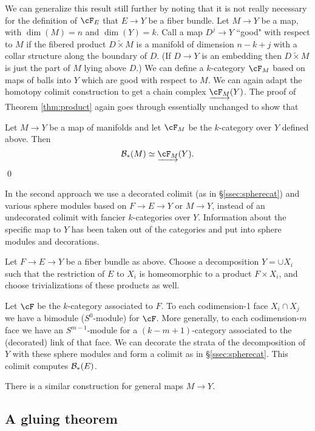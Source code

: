 We can generalize this result still further by noting that it is not really necessary
for the definition of $\cF_E$ that $E\to Y$ be a fiber bundle.
Let $M\to Y$ be a map, with $\dim(M) = n$ and $\dim(Y) = k$.
Call a map $D^j\to Y$ ``good" with respect to $M$ if the fibered product
$D\widetilde{\times} M$ is a manifold of dimension $n-k+j$ with a collar structure along the boundary of $D$.
(If $D\to Y$ is an embedding then $D\widetilde{\times} M$ is just the part of $M$
lying above $D$.)
We can define a $k$-category $\cF_M$ based on maps of balls into $Y$ which are good with respect to $M$.
We can again adapt the homotopy colimit construction to
get a chain complex $\cl{\cF_M}(Y)$.
The proof of Theorem \ref{thm:product} again goes through essentially unchanged 
to show that
\begin{thm}
Let $M \to Y$ be a map of manifolds and let $\cF_M$ be the $k$-category over $Y$ defined above.
Then
\[
	\bc_*(M) \simeq \cl{\cF_M}(Y) .
\]
\qed
\end{thm}


\medskip

In the second approach we use a decorated colimit (as in \S \ref{ssec:spherecat}) 
and various sphere modules based on $F \to E \to Y$
or $M\to Y$, instead of an undecorated colimit with fancier $k$-categories over $Y$.
Information about the specific map to $Y$ has been taken out of the categories
and put into sphere modules and decorations.

Let $F \to E \to Y$ be a fiber bundle as above.
Choose a decomposition $Y = \cup X_i$
such that the restriction of $E$ to $X_i$ is homeomorphic to a product $F\times X_i$,
and choose trivializations of these products as well.

Let $\cF$ be the $k$-category associated to $F$.
To each codimension-1 face $X_i\cap X_j$ we have a bimodule ($S^0$-module) for $\cF$.
More generally, to each codimension-$m$ face we have an $S^{m-1}$-module for a $(k{-}m{+}1)$-category
associated to the (decorated) link of that face.
We can decorate the strata of the decomposition of $Y$ with these sphere modules and form a 
colimit as in \S \ref{ssec:spherecat}.
This colimit computes ${\mathcal B}_*(E)$.

There is a similar construction for general maps $M\to Y$.





\subsection{A gluing theorem}
\label{sec:gluing}

